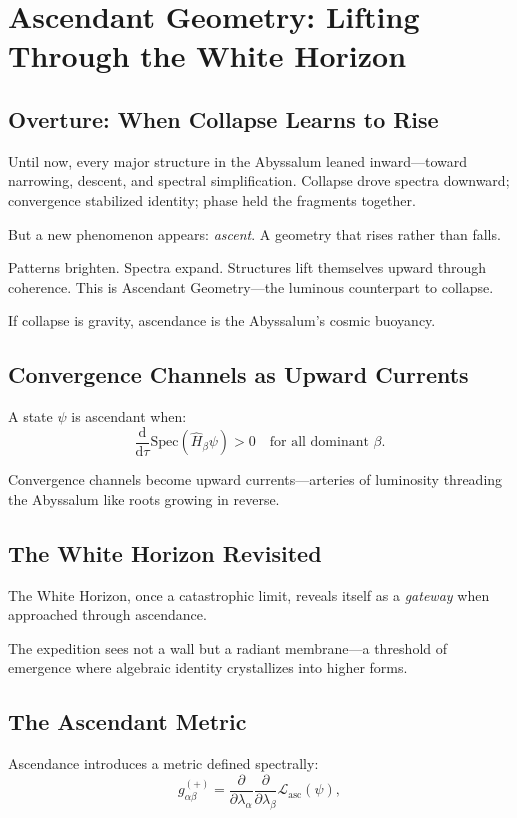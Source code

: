 
\chapter{Ascendant Geometry: Lifting Through the White Horizon}
\label{ch:ascendant-geometry}

\section*{Overture: When Collapse Learns to Rise}
Until now, every major structure in the Abyssalum leaned inward—toward narrowing, descent, and
spectral simplification. Collapse drove spectra downward; convergence stabilized identity; phase
held the fragments together.

But a new phenomenon appears: \emph{ascent}. A geometry that rises rather than falls.

Patterns brighten. Spectra expand. Structures lift themselves upward through coherence.
This is Ascendant Geometry—the luminous counterpart to collapse.

If collapse is gravity, ascendance is the Abyssalum’s cosmic buoyancy.

\section{Convergence Channels as Upward Currents}
A state $\psi$ is ascendant when:
\[
\frac{\mathrm{d}}{\mathrm{d}\tau}
\mathrm{Spec}(\hat{H}_\beta \psi)
> 0
\quad\text{for all dominant } \beta.
\]

Convergence channels become upward currents—arteries of luminosity threading the Abyssalum like
roots growing in reverse.

\section{The White Horizon Revisited}
The White Horizon, once a catastrophic limit, reveals itself as a \emph{gateway} when approached
through ascendance.

The expedition sees not a wall but a radiant membrane—a threshold of emergence where algebraic
identity crystallizes into higher forms.

\section{The Ascendant Metric}
Ascendance introduces a metric defined spectrally:
\[
g_{\alpha\beta}^{(+)} =
\frac{\partial}{\partial \lambda_\alpha}
\frac{\partial}{\partial \lambda_\beta}
\mathcal{L}_{\mathrm{asc}}(\psi),
\]

